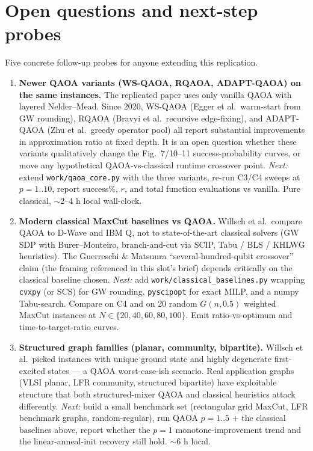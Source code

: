 \section{Open questions and next-step probes}
\label{sec:open-questions}

Five concrete follow-up probes for anyone extending this replication.

\begin{enumerate}

\item \textbf{Newer QAOA variants (WS-QAOA, RQAOA, ADAPT-QAOA) on the same
instances.}
The replicated paper uses only vanilla QAOA with layered Nelder--Mead.
Since 2020, WS-QAOA (Egger et al.\ warm-start from GW rounding), RQAOA
(Bravyi et al.\ recursive edge-fixing), and ADAPT-QAOA (Zhu et al.\ greedy
operator pool) all report substantial improvements in approximation ratio
at fixed depth. It is an open question whether these variants qualitatively
change the Fig.~7/10--11 success-probability curves, or move any hypothetical
QAOA-vs-classical runtime crossover point.
\emph{Next:} extend \texttt{work/qaoa\_core.py} with the three variants,
re-run C3/C4 sweeps at $p=1..10$, report success\%, $r$, and total function
evaluations vs vanilla. Pure classical, $\sim$2--4 h local wall-clock.

\item \textbf{Modern classical MaxCut baselines vs QAOA.}
Willsch et al.\ compare QAOA to D-Wave and IBM Q, not to state-of-the-art
classical solvers (GW SDP with Burer--Monteiro, branch-and-cut via SCIP,
Tabu / BLS / KHLWG heuristics). The Guerreschi \& Matsuura
``several-hundred-qubit crossover'' claim (the framing referenced in this
slot's brief) depends critically on the classical baseline chosen.
\emph{Next:} add \texttt{work/classical\_baselines.py} wrapping
\texttt{cvxpy} (or SCS) for GW rounding, \texttt{pyscipopt} for exact MILP,
and a numpy Tabu-search. Compare on C4 and on 20 random $G(n,0.5)$ weighted
MaxCut instances at $N \in \{20,40,60,80,100\}$. Emit
ratio-vs-optimum and time-to-target-ratio curves.

\item \textbf{Structured graph families (planar, community, bipartite).}
Willsch et al.\ picked instances with unique ground state and highly
degenerate first-excited states --- a QAOA worst-case-ish scenario. Real
application graphs (VLSI planar, LFR community, structured bipartite) have
exploitable structure that both structured-mixer QAOA and classical
heuristics attack differently.
\emph{Next:} build a small benchmark set (rectangular grid MaxCut,
LFR benchmark graphs, random-regular), run QAOA $p=1..5$ + the classical
baselines above, report whether the $p{=}1$ monotone-improvement trend and
the linear-anneal-init recovery still hold. $\sim$6 h local.


\end{enumerate}

